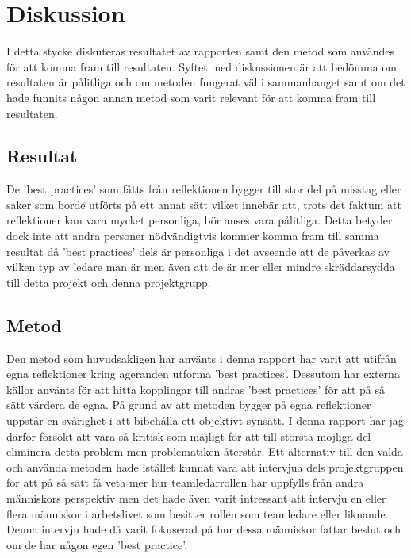 \section{Diskussion}
I detta stycke diskuteras resultatet av rapporten samt den metod som användes för att komma fram till resultaten. Syftet med diskussionen är att bedömma om resultaten är pålitliga och om metoden fungerat väl i sammanhanget samt om det hade funnits någon annan metod som varit relevant för att komma fram till resultaten.

\subsection{Resultat}
De 'best practices' som fåtts från reflektionen bygger till stor del på misstag eller saker som borde utförts på ett annat sätt vilket innebär att, trots det faktum att reflektioner kan vara mycket personliga, bör anses vara pålitliga. Detta betyder dock inte att andra personer nödvändigtvis kommer komma fram till samma resultat då 'best practices' dels är personliga i det avseende att de påverkas av vilken typ av ledare man är men även att de är mer eller mindre skräddarsydda till detta projekt och denna projektgrupp. 

\subsection{Metod}
Den metod som huvudsakligen har använts i denna rapport har varit att utifrån egna reflektioner kring ageranden utforma 'best practices'. Dessutom har externa källor använts för att hitta kopplingar till andras 'best practices' för att på så sätt värdera de egna. 
\newline \newline
På grund av att metoden bygger på egna reflektioner uppstår en svårighet i att bibehålla ett objektivt synsätt. I denna rapport har jag därför försökt att vara så kritisk som mäjligt för att till största möjliga del eliminera detta problem men problematiken återstår. 
\newline \newline 
Ett alternativ till den valda och använda metoden hade istället kunnat vara att intervjua dels projektgruppen för att på så sätt få veta mer hur teamledarrollen har uppfylls från andra människors perspektiv men det hade även varit intressant att intervju en eller flera människor i arbetslivet som besitter rollen som teamledare eller liknande. Denna intervju hade då varit fokuserad på hur dessa människor fattar beslut och om de har någon egen 'best practice'.